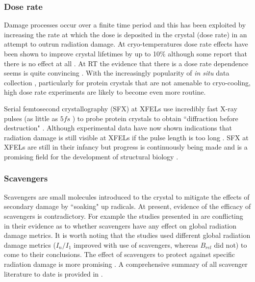         \subsubsection{Dose rate}
        \label{subs:Dose rate}
            Damage processes occur over a finite time period and this has been exploited by increasing the rate at which the dose is deposited in the crystal (dose rate) in an attempt to outrun radiation damage. 
			At cryo-temperatures dose rate effects have been shown to improve crystal lifetimes by up to 10\% \cite{owen2006} although some report that there is no effect at all \cite{sliz2003}. 
			At RT the evidence that there is a dose rate dependence seems is quite convincing \cite{south2007,owen2012,owen2014}. 
			With the increasingly popularity of \textit{in situ} data collection \cite{axford2015structure,axford2012situ}, particularly for protein crystals that are not amenable to cryo-cooling, high dose rate experiments are likely to become even more routine.

            Serial femtosecond crystallography (SFX) at XFELs use incredibly fast X-ray pulses (as little as $5 fs$ \cite{boutet2012high}) to probe protein crystals to obtain ``diffraction before destruction" \cite{chapman2014diffraction}. 
			Although experimental data have now shown indications that radiation damage is still visible at XFELs if the pulse length is too long \cite{nass2015indications}. 
			SFX at XFELs are still in their infancy but progress is continuously being made and is a promising field for the development of structural biology \cite{garman2014,brooks2015nobel}.


        \subsubsection{Scavengers}
        \label{subs:Scavengers}
            Scavengers are small molecules introduced to the crystal to mitigate the effects of secondary damage by ``soaking" up radicals. 
			At present, evidence of the efficacy of scavengers is contradictory. 
			For example the studies presented in \cite{barker2009room,kmetko2011can} are conflicting in their evidence as to whether scavengers have any effect on global radiation damage metrics. 
			It is worth noting that the studies used different global radiation damage metrics ($I_n/I_1$ improved with use of scavengers, whereas $B_{rel}$ did not) to come to their conclusions. 
			The effect of scavengers to protect against specific radiation damage is more promising \cite{southworth2007radioprotectant}. 
			A comprehensive summary of all scavenger literature to date is provided in \cite{allan2012}.


